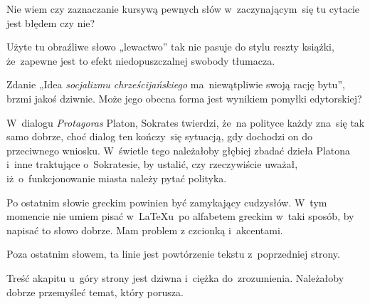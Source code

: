 \documentclass[a4paper,11pt]{article}
\numberwithin{equation}{section}
\begin{document}
\noindent
{} Nie wiem czy zaznaczanie kursywą pewnych słów
w~zaczynającym~się tu cytacie jest błędem czy nie?

\VerSpaceFour





\noindent
{} Użyte tu obraźliwe słowo „lewactwo” tak nie pasuje
do stylu
reszty książki, że~zapewne jest to efekt niedopuszczalnej swobody tłumacza.

\VerSpaceFour





\noindent
{} Zdanie „Idea \textit{socjalizmu chrześcijańskiego}
ma~niewątpliwie swoją rację bytu”, brzmi jakoś dziwnie. Może jego obecna
forma jest wynikiem pomyłki edytorskiej?

\VerSpaceFour





\noindent
{} W~dialogu \textit{Protagoras} Platon, Sokrates twierdzi,
że~na polityce każdy zna~się tak samo dobrze, choć dialog ten kończy~się
sytuacją, gdy dochodzi on do przeciwnego wniosku. W~świetle tego należałoby
głębiej zbadać dzieła Platona i~inne traktujące o~Sokratesie, by ustalić,
czy rzeczywiście uważał, iż~o~funkcjonowanie miasta należy pytać polityka.

\VerSpaceFour





\noindent
{} Po ostatnim słowie greckim powinien być zamykający
cudzysłów. W~tym momencie nie umiem pisać w~\LaTeX u~po alfabetem greckim
w~taki sposób, by napisać to słowo dobrze. Mam problem z czcionką
i~akcentami.

\VerSpaceFour





\noindent
{} Poza ostatnim słowem, ta linie jest powtórzenie
tekstu z~poprzedniej strony.

\VerSpaceFour





\noindent
{} Treść akapitu u~góry strony jest dziwna i~ciężka do~zrozumienia.
Należałoby dobrze przemyśleć temat, który porusza.

\VerSpaceFour
\end{document}
